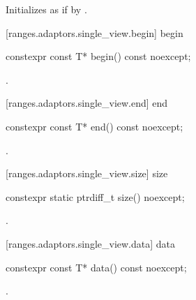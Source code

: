 \begin{itemdescr}
\pnum
\effects Initializes  as if by
.
\end{itemdescr}

[ranges.adaptors.single_view.begin]{ begin}

%
\begin{itemdecl}
constexpr const T* begin() const noexcept;
\end{itemdecl}

\begin{itemdescr}
\pnum
\requires {}

\pnum
\returns {}.
\end{itemdescr}

[ranges.adaptors.single_view.end]{ end}

%
\begin{itemdecl}
constexpr const T* end() const noexcept;
\end{itemdecl}

\begin{itemdescr}
\pnum
\requires {}

\pnum
\returns {}.
\end{itemdescr}

[ranges.adaptors.single_view.size]{ size}

%
\begin{itemdecl}
constexpr static ptrdiff_t size() noexcept;
\end{itemdecl}

\begin{itemdescr}
\pnum
\requires {}

\pnum
\returns {}.
\end{itemdescr}

[ranges.adaptors.single_view.data]{ data}

%
\begin{itemdecl}
constexpr const T* data() const noexcept;
\end{itemdecl}

\begin{itemdescr}
\pnum
\requires {}

\pnum
\returns {}.
\end{itemdescr}

